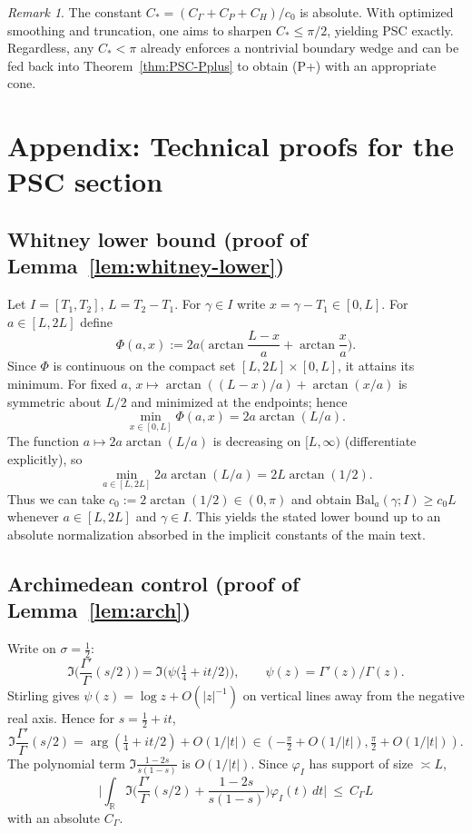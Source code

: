 \documentclass[11pt]{article}
\theoremstyle{definition}
\theoremstyle{remark}
\newtheorem{remark}[theorem]{Remark}
\newcommand{\R}{\mathbb{R}}
\begin{document}
\begin{remark}
The constant \(C_*=(C_\Gamma+C_P+C_H)/c_0\) is absolute. With optimized smoothing and truncation, one aims to sharpen \(C_*\le \pi/2\), yielding PSC exactly. Regardless, any \(C_*<\pi\) already enforces a nontrivial boundary wedge and can be fed back into Theorem~\ref{thm:PSC-Pplus} to obtain (P+) with an appropriate cone.
\end{remark}

\appendix
\section{Appendix: Technical proofs for the PSC section}\label{app:psc-tech}

\subsection{Whitney lower bound (proof of Lemma~\ref{lem:whitney-lower})}
Let \(I=[T_1,T_2]\), \(L=T_2-T_1\). For \(\gamma\in I\) write \(x=\gamma-T_1\in[0,L]\). For \(a\in[L,2L]\) define
\[\Phi(a,x):=2a\Big(\arctan\frac{L-x}{a}+\arctan\frac{x}{a}\Big).\]
Since \(\Phi\) is continuous on the compact set \([L,2L]\times[0,L]\), it attains its minimum. For fixed \(a\), \(x\mapsto\arctan((L-x)/a)+\arctan(x/a)\) is symmetric about \(L/2\) and minimized at the endpoints; hence
\[\min_{x\in[0,L]}\Phi(a,x)=2a\arctan(L/a).\]
The function \(a\mapsto 2a\arctan(L/a)\) is decreasing on \([L,\infty)\) (differentiate explicitly), so
\[\min_{a\in[L,2L]}2a\arctan(L/a)=2L\arctan(1/2).\]
Thus we can take \(c_0:=2\arctan(1/2)\in(0,\pi)\) and obtain \(\mathrm{Bal}_a(\gamma;I)\ge c_0 L\) whenever \(a\in[L,2L]\) and \(\gamma\in I\). This yields the stated lower bound up to an absolute normalization absorbed in the implicit constants of the main text.

\subsection{Archimedean control (proof of Lemma~\ref{lem:arch})}
Write on \(\sigma=\tfrac12\):
\[\Im\Big(\frac{\Gamma'}{\Gamma}(s/2)\Big)=\Im\Big(\psi\big(\tfrac14+it/2\big)\Big),\qquad \psi(z)=\Gamma'(z)/\Gamma(z).\]
Stirling gives \(\psi(z)=\log z+O(|z|^{-1})\) on vertical lines away from the negative real axis. Hence for \(s=\tfrac12+it\),
\[\Im\frac{\Gamma'}{\Gamma}(s/2)=\arg(\tfrac14+it/2)+O(1/|t|)\in(-\tfrac{\pi}{2}+O(1/|t|),\tfrac{\pi}{2}+O(1/|t|)).\]
The polynomial term \(\Im\frac{1-2s}{s(1-s)}\) is \(O(1/|t|)\). Since \(\varphi_I\) has support of size \(\asymp L\),
\[\Big|\int_{\R}\Im\Big(\frac{\Gamma'}{\Gamma}(s/2)+\frac{1-2s}{s(1-s)}\Big)\varphi_I(t)\,dt\Big|\ \le\ C_\Gamma L\]
with an absolute \(C_\Gamma\).
\end{document}
